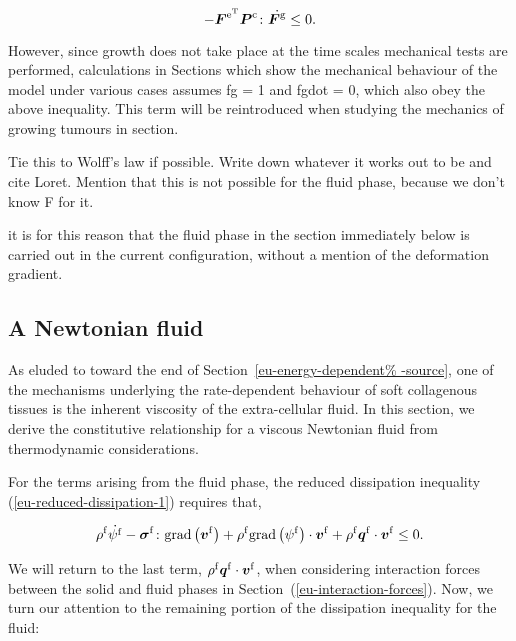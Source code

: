 \begin{equation}
- \mbox{\boldmath$ F$}^{\mathrm{e}^{\mathrm{T}}}  \mbox{\boldmath$ P$}^{\mathrm{c}} \colon
\dot{\mbox{\boldmath$ F$}^{\mathrm{g}}}
\leq 0.
\end{equation}

However, since growth does not take place at the time scales
mechanical tests are performed, calculations in Sections which show
the mechanical behaviour of the model under various cases assumes
fg = 1 and fgdot = 0, which also obey the above inequality. This term
will be reintroduced when studying the mechanics of growing tumours in
section. 

Tie this to Wolff's law if possible. Write down whatever it works out
to be and cite Loret. Mention that this is not possible for the fluid
phase, because we don't know F for it.
\citep{wolff1892}

it is for this reason that the fluid phase in the section immediately
below is carried out in the current configuration, without a mention
of the deformation gradient.

 
\subsection{A Newtonian fluid}
\label{eu-newtonian-fluid}

As eluded to toward the end of Section~\ref{eu-energy-dependent%
  -source}, one of the mechanisms underlying the rate-dependent
behaviour of soft collagenous tissues is the inherent viscosity of the
extra-cellular fluid. In this section, we derive the constitutive
relationship for a viscous Newtonian fluid from thermodynamic
considerations.

For the terms arising from the fluid phase, the reduced dissipation
inequality (\ref{eu-reduced-dissipation-1}) requires that,

\begin{equation*}
\rho^{\mathrm{f}} \dot{\psi^{\mathrm{f}}}
-\mbox{\boldmath$\sigma$}^{\mathrm{f}}\colon\mathrm{grad}\left(\mbox{\boldmath$ v$}^{\mathrm{f}}\right)+
\rho^{\mathrm{f}} \mathrm{grad}\left(\psi^{\mathrm{f}}\right)
\cdot\mbox{\boldmath$ v$}^{\mathrm{f}} +\rho^{\mathrm{f}}
\mbox{\boldmath$ q$}^{\mathrm{f}}\cdot\mbox{\boldmath$ v$}^{\mathrm{f}} \leq 0.
\end{equation*}

\noindent We will return to the last term, $\rho^{\mathrm{f}}
\mbox{\boldmath$ q$}^{\mathrm{f}} \cdot \mbox{\boldmath$ v$}^{\mathrm{f}}$, when considering interaction
forces between the solid and fluid phases in
Section~(\ref{eu-interaction-forces}). Now, we turn our attention to
the remaining portion of the dissipation inequality for the fluid:

